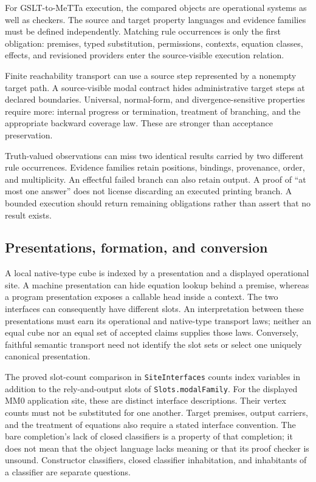\documentclass[11pt]{article}
\newcommand{\code}[1]{\nolinkurl{#1}}
\begin{document}
For GSLT-to-MeTTa execution, the compared objects are operational systems
as well as checkers. The source and target property languages and evidence
families must be defined independently. Matching rule occurrences is
only the first obligation: premises, typed substitution, permissions,
contexts, equation classes, effects, and revisioned providers enter
the source-visible execution relation.

Finite reachability transport can use a source step represented by a
nonempty target path. A source-visible modal contract hides administrative
target steps at declared boundaries. Universal, normal-form, and
divergence-sensitive properties require more: internal progress or
termination, treatment of branching, and the appropriate backward
coverage law. These are stronger than acceptance preservation.

Truth-valued observations can miss two identical results carried by two
different rule occurrences. Evidence families retain positions,
bindings, provenance, order, and multiplicity. An effectful failed branch
can also retain output. A proof of ``at most one answer'' does not license
discarding an executed printing branch. A bounded execution should return
remaining obligations rather than assert that no result exists.

\subsection{Presentations, formation, and conversion}
A local native-type cube is indexed by a presentation and a displayed
operational site. A machine presentation can hide equation lookup behind
a premise, whereas a program presentation exposes a callable head inside
a context. The two interfaces can consequently have different slots.
An interpretation between these presentations must earn its operational
and native-type transport laws; neither an equal cube nor an equal set
of accepted claims supplies those laws. Conversely, faithful semantic
transport need not identify the slot sets or select one uniquely
canonical presentation.

The proved slot-count comparison in \code{SiteInterfaces} counts index variables
in addition to the rely-and-output slots of \code{Slots.modalFamily}.
For the displayed MM0 application site, these are distinct interface
descriptions. Their vertex counts must not be substituted for one
another. Target premises, output carriers, and the treatment of equations
also require a stated interface convention. The bare completion's lack
of closed classifiers is a property of that completion; it does not mean
that the object language lacks meaning or that its proof checker is
unsound. Constructor classifiers, closed classifier inhabitation, and
inhabitants of a classifier are separate questions.
\end{document}
